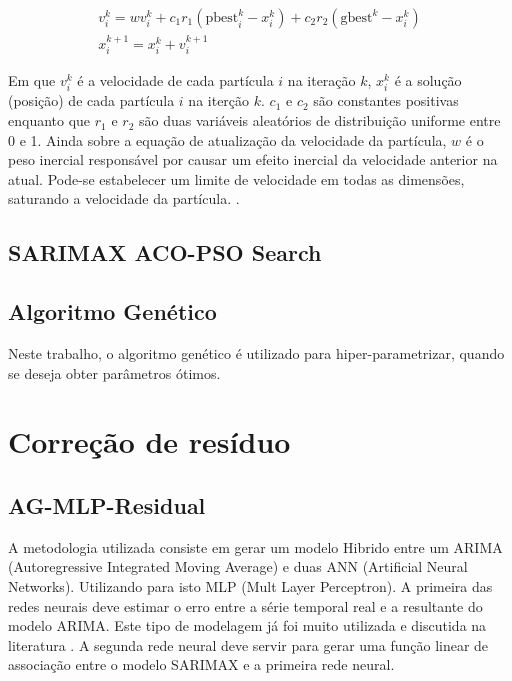 \begin{equation}
\label{eq:pso_vk}
    \begin{gathered}
    v_i^k=wv_i^k+c_1r_1{(\mathrm{pbest}_i^k-x_i^k)}+c_2r_2{(\mathrm{gbest}^k-x_i^k)} \\
    x_i^{k+1}=x_i^k+v_i^{k+1}
    \end{gathered}
\end{equation}

Em que $v_i^k$ é a velocidade de cada partícula $i$ na iteração $k$, $x_i^{k}$ é a solução (posição) de cada partícula $i$ na iterção $k$. $c_1$ e $c_2$ são constantes positivas enquanto que $r_1$ e $r_2$ são duas variáveis aleatórios de distribuição uniforme entre 0 e 1. Ainda sobre a equação de atualização da velocidade da partícula,  $w$ é o peso inercial responsável por causar um efeito inercial da velocidade anterior na atual. Pode-se estabelecer um limite de velocidade em todas as dimensões, saturando a velocidade da partícula. \cite{jaberipour2011particle}.

\subsection{SARIMAX ACO-PSO Search}


\subsection{Algoritmo Genético}

Neste trabalho, o algoritmo genético é utilizado para hiper-parametrizar, quando se deseja obter parâmetros ótimos.

\section{Correção de resíduo}

\subsection{AG-MLP-Residual}

A metodologia utilizada consiste em gerar um modelo Hibrido entre um ARIMA (Autoregressive Integrated Moving Average) e duas ANN (Artificial Neural Networks). Utilizando para isto MLP (Mult Layer Perceptron). A primeira das redes neurais deve estimar o erro entre a série temporal real e a resultante do modelo ARIMA. Este tipo de modelagem já foi muito utilizada e discutida na literatura \cite{zhang2003time, khashei2010artificial, babu2014moving, de2014hybrid, de2016hybrid, domingos2019intelligent}. A segunda rede neural deve servir para gerar uma função linear de associação entre o modelo SARIMAX e a primeira rede neural.


